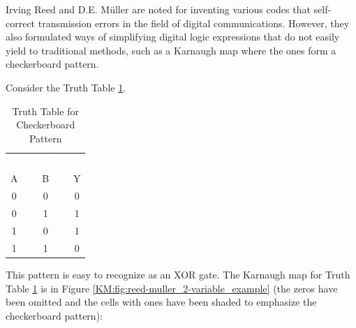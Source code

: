 Irving Reed and D.E. M\"{u}ller are noted for inventing various codes that self-correct transmission errors in the field of digital communications. However, they also formulated ways of simplifying digital logic expressions that do not easily yield to traditional methods, such as a Karnaugh map where the ones form a checkerboard pattern.

Consider the Truth Table \ref{03:tab:truth_table_for_checkerboard_pattern}.

\begin{table}[H]
  \sffamily
  \newcommand{\head}[1]{\textcolor{white}{\textbf{#1}}}    
  \begin{center}
    \begin{tabular}{ccc} 
      \rowcolor{black!75}
      \multicolumn{2}{c}{\head{Inputs}} & \head{Output} \\
      A & B & Y \\
      \hline
      0 & 0 & 0 \\
      0 & 1 & 1 \\
      1 & 0 & 1 \\
      1 & 1 & 0 
    \end{tabular}
  \end{center}
  \caption{Truth Table for Checkerboard Pattern}
  \label{03:tab:truth_table_for_checkerboard_pattern}
\end{table}

This pattern is easy to recognize as an \textsf{XOR} gate. The Karnaugh map for Truth Table \ref{03:tab:truth_table_for_checkerboard_pattern} is in Figure \ref{KM:fig:reed-muller_2-variable_example} (the zeros have been omitted and the cells with ones have been shaded to emphasize the checkerboard pattern): 

